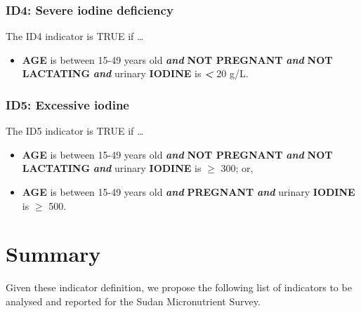 \documentclass[12pt,a4paper]{article}
\providecommand{\tightlist}{%
  \setlength{\itemsep}{0pt}\setlength{\parskip}{0pt}}
\begin{document}
\hypertarget{id4-severe-iodine-deficiency}{%
\subsubsection{ID4: Severe iodine deficiency}\label{id4-severe-iodine-deficiency}}

The ID4 indicator is TRUE if \ldots{}

\begin{itemize}
\tightlist
\item
  \textbf{AGE} is between 15-49 years old \textbf{\emph{and}} \textbf{NOT PREGNANT} \textbf{\emph{and}} \textbf{NOT LACTATING} \textbf{\emph{and}} urinary \textbf{IODINE} is \textbf{\emph{\textless{}}} 20 g/L.
\end{itemize}

\hypertarget{id5-excessive-iodine}{%
\subsubsection{ID5: Excessive iodine}\label{id5-excessive-iodine}}

The ID5 indicator is TRUE if \ldots{}

\begin{itemize}
\item
  \textbf{AGE} is between 15-49 years old \textbf{\emph{and}} \textbf{NOT PREGNANT} \textbf{\emph{and}} \textbf{NOT LACTATING} \textbf{\emph{and}} urinary \textbf{IODINE} is \textbf{\emph{\(\geq\)}} 300; or,
\item
  \textbf{AGE} is between 15-49 years old \textbf{\emph{and}} \textbf{PREGNANT} \textbf{\emph{and}} urinary \textbf{IODINE} is \textbf{\emph{\(\geq\)}} 500.
\end{itemize}

\hypertarget{summary}{%
\section{Summary}\label{summary}}

Given these indicator definition, we propose the following list of indicators to be analysed and reported for the Sudan Micronutrient Survey.
\end{document}
